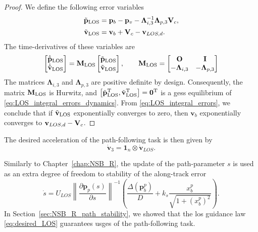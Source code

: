 \begin{proof}
 We define the following error variables 
\begin{subequations}\label{eq:LOS_integral_errors}
 \begin{align}
     \Tilde{\mathbf{p}}_{\rm LOS} &= \mathbf{p}_b-\mathbf{p}_v - \bm{\Lambda}_{i,3}^{-1}\bm{\Lambda}_{p,3} \mathbf{V}_c,\\
     \Tilde{\mathbf{v}}_{\rm LOS} &= \mathbf{v}_b + \mathbf{V}_c - \mathbf{v}_{LOS,d}.
 \end{align}
\end{subequations}
The time-derivatives of these variables are
\begin{equation}
    \begin{bmatrix}
        \dot{\Tilde{\mathbf{p}}}_{\rm LOS} \\ \dot{\Tilde{\mathbf{v}}}_{\rm LOS}
    \end{bmatrix} 
    = 
    \mathbf{M}_{\rm LOS}
    \begin{bmatrix}
        \Tilde{\mathbf{p}}_{\rm LOS} \\ \Tilde{\mathbf{v}}_{\rm LOS}
    \end{bmatrix}, 
    \qquad
    \mathbf{M}_{\rm LOS}
    =
    \begin{bmatrix}
        \mathbf{O} & \mathbf{I}\\
        -\mathbf{\Lambda}_{i,3} & -\mathbf{\Lambda}_{p,3}
    \end{bmatrix}
    \label{eq:LOS_integral_errors_dynamics}
\end{equation}
The matrices $\mathbf{\Lambda}_{i,3}$ and $\mathbf{\Lambda}_{p,3}$ are positive definite by design.
Consequently, the matrix $\mathbf{M}_{\rm LOS}$ is Hurwitz, and $\left[\Tilde{\mathbf{p}}_{\rm LOS}^{\mathrm{T}}, \Tilde{\mathbf{v}}_{\rm LOS}^{\mathrm{T}}\right] = \mathbf{0}^{\mathrm{T}}$ is a \glspl{ges} equilibrium of \eqref{eq:LOS_integral_errors_dynamics}.
From \eqref{eq:LOS_integral_errors}, we conclude that if $\Tilde{\mathbf{v}}_{\rm LOS}$ exponentially converges to zero, then $\mathbf{v}_b$ exponentially converges to $\mathbf{v}_{LOS,d}-\mathbf{V}_c$.
\end{proof}

The desired acceleration of the path-following task is then given by
\begin{equation}
    \dot{\mathbf{v}}_3 = \mathbf{1}_{n} \otimes \dot{\mathbf{v}}_{LOS}.
\end{equation}

Similarly to Chapter~\ref{chap:NSB_R}, the update of the path-parameter $s$ is used as an extra degree of freedom to stability of the along-track error
\begin{equation}\label{eq:path_update}
    \dot{s} = U_{LOS}\left \| \frac{\partial \mathbf{p}_p(s)}{\partial s}\right \|^{-1} \left (\frac{\Delta(\mathbf{p}_b^p)}{D} +  k_s\frac{x_b^p}{\sqrt{1 + (x_b^p)^2}} \right ).
\end{equation}
In Section~\ref{sec:NSB_R_path_stability}, we showed that the \gls{los} guidance law \eqref{eq:desired_LOS} guarantees \acrfull{usges} of the path-following task.

